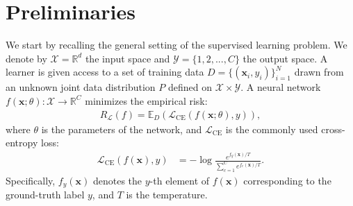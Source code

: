 \documentclass{article}
\def\*#1{\mathbf{#1}}
\begin{document}





\vspace{-0.2cm}
\section{Preliminaries}
\label{sec:background}
\vspace{-0.2cm}
We start by recalling the general setting of the supervised learning problem. We denote by $\mathcal{X}=\mathbb{R}^d$ the input space and $\mathcal{Y}=\{1,2,..., C\}$ the output space. A learner is given access to a set of training data $D=\{(\*x_i,y_i)\}_{i=1}^N$ drawn from an unknown joint data distribution $P$ defined on $\mathcal{X}\times \mathcal{Y}$. %
A neural network $f(\*x;\theta): \mathcal{X} \to \mathbb{R}^C$ minimizes the empirical risk: %
\begin{align*}
R_\mathcal{L}(f)=\mathbb{E}_{D}(\mathcal{L}_\text{CE}(f(\*x;\theta),y)),
\end{align*}
where $\theta$ is the parameters of the network, and $\mathcal{L}_\text{CE}$ is the commonly used cross-entropy loss:
\begin{align}
    \mathcal{L}_\text{CE} (f(\*x),y) &= - \log{ \frac{e^{{f_{y}(\*x)} / T}}{\sum_{c=1}^C e^{{f_{c}(\*x)} / T}}}.
\end{align}
Specifically, $f_y(\*x)$ denotes the $y$-th element of $f(\*x)$ corresponding to the ground-truth label $y$, and $T$ is the temperature.%
\end{document}
